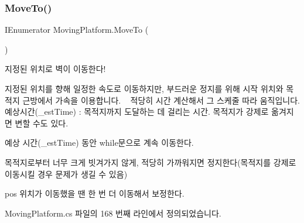 \subsubsection{\texorpdfstring{MoveTo()}{MoveTo()}}
{\footnotesize\ttfamily I\+Enumerator Moving\+Platform.\+Move\+To (\begin{DoxyParamCaption}{ }\end{DoxyParamCaption})\hspace{0.3cm}{\ttfamily [private]}}



지정된 위치로 벽이 이동한다! 

지정된 위치를 향해 일정한 속도로 이동하지만, 부드러운 정지를 위해 시작 위치와 목적지 근방에서 가속을 이용합니다. ~\newline
적당히 시간 계산해서 그 스케줄 따라 움직입니다. 예상시간(\+\_\+est\+Time) \+: 목적지까지 도달하는 데 걸리는 시간. 목적지가 강제로 옮겨지면 변할 수도 있다.

예상 시간(\+\_\+est\+Time) 동안 while문으로 계속 이동한다.

목적지로부터 너무 크게 빗겨가지 않게, 적당히 가까워지면 정지한다(목적지를 강제로 이동시킬 경우 문제가 생길 수 있음)

pos 위치가 이동했을 땐 한 번 더 이동해서 보정한다. 

Moving\+Platform.\+cs 파일의 168 번째 라인에서 정의되었습니다.



